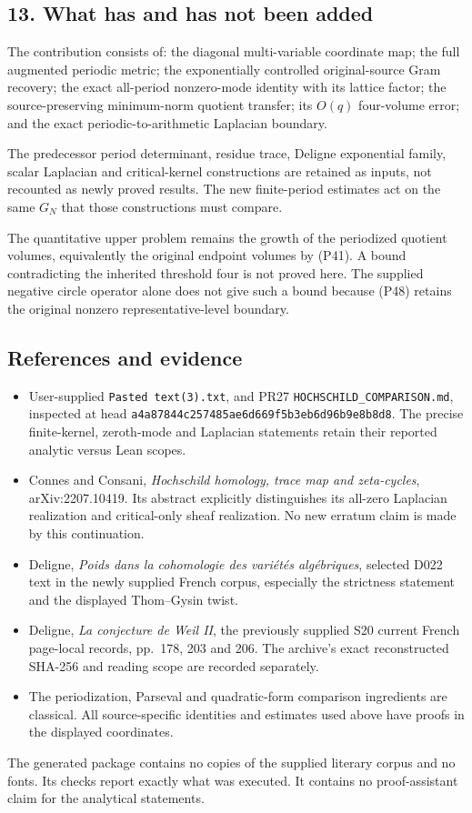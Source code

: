 \subsection{13. What has and has not been added}\label{endpoint-periodized_original--what-has-and-has-not-been-added}

The contribution consists of: the diagonal multi-variable coordinate map; the full augmented periodic metric; the exponentially controlled original-source Gram recovery; the exact all-period nonzero-mode identity with its lattice factor; the source-preserving minimum-norm quotient transfer; its \(O(q)\) four-volume error; and the exact periodic-to-arithmetic Laplacian boundary.

The predecessor period determinant, residue trace, Deligne exponential family, scalar Laplacian and critical-kernel constructions are retained as inputs, not recounted as newly proved results. The new finite-period estimates act on the same \(G_N\) that those constructions must compare.

The quantitative upper problem remains the growth of the periodized quotient volumes, equivalently the original endpoint volumes by (P41). A bound contradicting the inherited threshold four is not proved here. The supplied negative circle operator alone does not give such a bound because (P48) retains the original nonzero representative-level boundary.

\subsection{References and evidence}\label{endpoint-periodized_original--references-and-evidence}

\begin{itemize}
\tightlist
\item
  User-supplied \texttt{Pasted\ text(3).txt}, and PR27 \nolinkurl{HOCHSCHILD_COMPARISON.md}, inspected at head \nolinkurl{a4a87844c257485ae6d669f5b3eb6d96b9e8b8d8}. The precise finite-kernel, zeroth-mode and Laplacian statements retain their reported analytic versus Lean scopes.
\item
  Connes and Consani, \emph{Hochschild homology, trace map and zeta-cycles}, arXiv:2207.10419. Its abstract explicitly distinguishes its all-zero Laplacian realization and critical-only sheaf realization. No new erratum claim is made by this continuation.
\item
  Deligne, \emph{Poids dans la cohomologie des variétés algébriques}, selected D022 text in the newly supplied French corpus, especially the strictness statement and the displayed Thom--Gysin twist.
\item
  Deligne, \emph{La conjecture de Weil II}, the previously supplied S20 current French page-local records, pp.~178, 203 and 206. The archive's exact reconstructed SHA-256 and reading scope are recorded separately.
\item
  The periodization, Parseval and quadratic-form comparison ingredients are classical. All source-specific identities and estimates used above have proofs in the displayed coordinates.
\end{itemize}

The generated package contains no copies of the supplied literary corpus and no fonts. Its checks report exactly what was executed. It contains no proof-assistant claim for the analytical statements.
